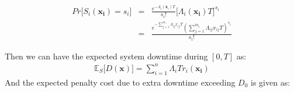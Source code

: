 \documentclass[preprint,12pt]{elsarticle}
\begin{document}
\begin {eqnarray}
Pr\bigg[S_{i}(\boldsymbol{x_i})=s_{i}\bigg]&=&\frac{e^{-\Lambda_{i}(\boldsymbol x_{i})T}}{s_{i}!}{\bigg[\Lambda_{i}(\boldsymbol{x_{i}})T\bigg]}^{s_{i}} \nonumber\\
&=& \frac{e^{-\sum_{j=1}^{m_{i}}{\Lambda_{ij}x_{ij}T}}(\sum_{j=1}^{m_{i}}{\Lambda_{ij}x_{ij}T})^{s_{i}}}{s_{i}!}
\end {eqnarray}

Then we can have the expected system downtime during $[0, T]$ as:
\begin{eqnarray}
\mathbb{E}_{S}\bigg[D(\boldsymbol{x})\bigg]=\sum_{i=1}^{n}{\Lambda_{i}T r_{i}(\boldsymbol{x_{i}})}
\end{eqnarray}
And the expected penalty cost due to extra downtime exceeding $D_0$ is given as:
\end{document}
